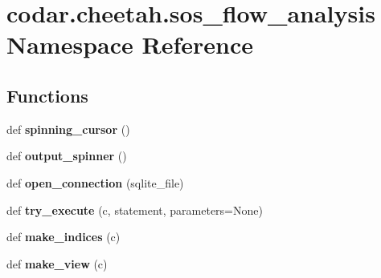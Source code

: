 \hypertarget{namespacecodar_1_1cheetah_1_1sos__flow__analysis}{}\section{codar.\+cheetah.\+sos\+\_\+flow\+\_\+analysis Namespace Reference}
\label{namespacecodar_1_1cheetah_1_1sos__flow__analysis}
\subsection*{Functions}
\begin{DoxyCompactItemize}
\item 
\mbox{\label{namespacecodar_1_1cheetah_1_1sos__flow__analysis_ad8cc33098c22fc9e9006e2185ef85851}} 
def {\bfseries spinning\+\_\+cursor} ()
\item 
\mbox{\label{namespacecodar_1_1cheetah_1_1sos__flow__analysis_af111ef7a221d6141c7d09eeb78705b0a}} 
def {\bfseries output\+\_\+spinner} ()
\item 
\mbox{\label{namespacecodar_1_1cheetah_1_1sos__flow__analysis_abcd7b3f86ed59b836f0b3b8904a610b7}} 
def {\bfseries open\+\_\+connection} (sqlite\+\_\+file)
\item 
\mbox{\label{namespacecodar_1_1cheetah_1_1sos__flow__analysis_acc38c3f974f486caf75452723d985d08}} 
def {\bfseries try\+\_\+execute} (c, statement, parameters=None)
\item 
\mbox{\label{namespacecodar_1_1cheetah_1_1sos__flow__analysis_a6591535847d3a8ad31b4084b5acf97e9}} 
def {\bfseries make\+\_\+indices} (c)
\item 
\mbox{\label{namespacecodar_1_1cheetah_1_1sos__flow__analysis_a1fa03def4487822f816a0297b649a54f}} 
def {\bfseries make\+\_\+view} (c)
\item 
\mbox{\label{namespacecodar_1_1cheetah_1_1sos__flow__analysis_a9c4380d1dc947f62649ca866ed157641}} 

\end{DoxyCompactItemize}
